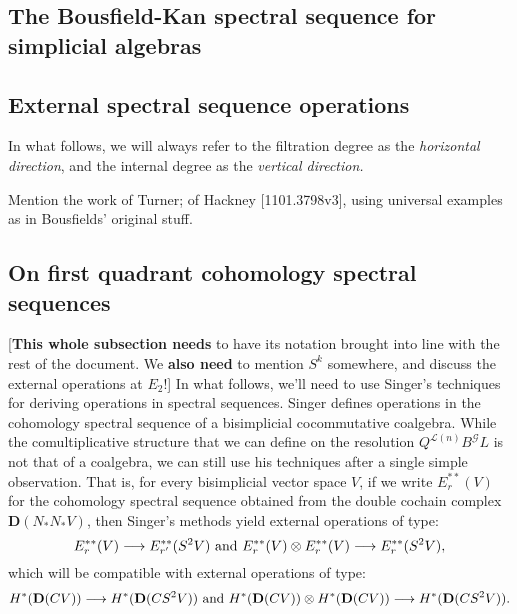 \documentclass[11pt]{amsart}
\theoremstyle{plain}
\theoremstyle{definition}
\renewcommand{\to}{\longrightarrow}
\newcommand{\scrG}{\mathscr{G}}
\newcommand{\calL}{\mathcal{L}}
\theoremstyle{plain}
\newcommand{\BSW}{{\scrG}}
\newcommand{\BSWres}{B^\BSW}%
\newcommand{\dual}{\mathbf{D}}
\begin{document}
\begin{The Bousfield-Kan spectral sequence for simplicial algebras}
\section{\textbf{The Bousfield-Kan spectral sequence for simplicial algebras}}

\hfil

\end{The Bousfield-Kan spectral sequence for simplicial algebras}


\begin{External spectral sequence operations}
\section{\textbf{External spectral sequence operations}}
In what follows, we will always refer to the filtration degree as the \emph{horizontal direction}, and the internal degree as the \emph{vertical direction.}

Mention the work of Turner; of Hackney [1101.3798v3], using universal examples as in Bousfields'  original stuff.





\subsection{On first quadrant cohomology spectral sequences}

[\textbf{This whole subsection needs} to have its notation brought into line with the rest of the document. We \textbf{also need} to mention $S^k$ somewhere, and discuss the external operations at $E_2$!] In what follows, we'll need to use Singer's techniques for deriving operations in spectral sequences. Singer defines operations in the cohomology spectral sequence of a bisimplicial cocommutative coalgebra. While the comultiplicative structure that we can define on the resolution $Q^{\calL(n)}\BSWres L$ is not that of a coalgebra, we can still use his techniques after a single simple observation. That is, for every bisimplicial vector space $V$, if we write $E_r^{**}(V)$ for the cohomology spectral sequence obtained from the double cochain complex $\dual(N_*N_*V)$, then Singer's methods yield external operations of type:
\[E_r^{**}(V)\to E_{r'}^{**}(S^2V)\textup{ and }E_r^{**}(V)\otimes E_r^{**}(V)\to E_r^{**}(S^2V),\]
which will be compatible with external operations of type:
\[H^*(\dual(CV))\to H^*(\dual(CS^2V))\textup{ and }H^*(\dual(CV))\otimes H^*(\dual(CV))\to H^*(\dual(CS^2V)).\]


\end{External spectral sequence operations}
\end{document}
